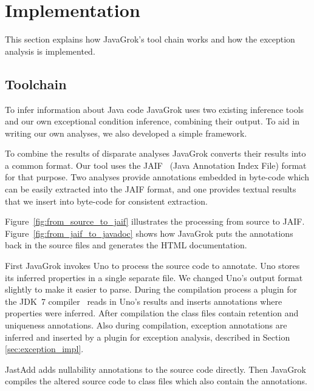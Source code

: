 \section{Implementation}
This section explains how JavaGrok's tool chain works and
how the exception analysis is implemented.

\subsection{Toolchain}

To infer information about Java code JavaGrok uses two existing inference tools and 
our own exceptional condition inference, combining their output. 
To aid in writing our own analyses, we also developed a simple 
framework. 

To combine the results of disparate analyses JavaGrok converts their results
into a common format.  Our tool uses the JAIF~\cite{JAIF}
(Java Annotation Index File) format for that purpose. Two analyses provide 
annotations embedded in byte-code which can be easily extracted into the JAIF 
format, and one provides textual results that we insert into byte-code for
consistent extraction.

Figure~\ref{fig:from_source_to_jaif} 
illustrates the processing from source to JAIF. Figure~\ref{fig:from_jaif_to_javadoc} shows how JavaGrok
puts the annotations back in the source files and generates the HTML
documentation.

\begin{figure*}
\centering
{}
\caption{JavaGrok's toolchain from JAIF to Javadoc}
\label{fig:from_jaif_to_javadoc}
\end{figure*}

First JavaGrok invokes Uno to process the source code to annotate. 
Uno stores its inferred properties in a single separate file. We changed Uno's 
output format slightly to make it easier to parse.
During the compilation process a plugin for the JDK~7 compiler~\cite{jdk7} reads in Uno's results 
and inserts annotations where properties were inferred. 
After compilation the class files contain retention and uniqueness
annotations.
Also during compilation, exception annotations are inferred and inserted by a
plugin for exception analysis, described in Section \ref{sec:exception_impl}. 

JastAdd adds nullability 
annotations to the source code directly. Then JavaGrok compiles the 
altered source code to class files which also contain the annotations.


